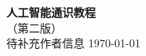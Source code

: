 \begin{titlepage}
\centering
\vspace*{4cm}
{\Huge\bfseries 人工智能通识教程\\[1em]}
{\Large （第二版）\\[3cm]}
{\large 待补充作者信息}
\vfill
{\large \today}
\end{titlepage}
